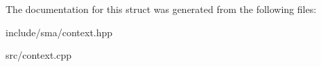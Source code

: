 The documentation for this struct was generated from the following files\-:\begin{DoxyCompactItemize}
\item 
include/sma/context.\-hpp\item 
src/context.\-cpp\end{DoxyCompactItemize}
